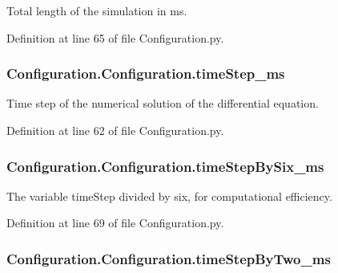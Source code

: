 Total length of the simulation in ms. 



Definition at line 65 of file Configuration.\+py.

\subsubsection[{\texorpdfstring{time\+Step\+\_\+ms}{timeStep_ms}}]{\setlength{\rightskip}{0pt plus 5cm}Configuration.\+Configuration.\+time\+Step\+\_\+ms}\hypertarget{class_configuration_1_1_configuration_a6379aaa6e54523ca81e3713d1846679b}{}\label{class_configuration_1_1_configuration_a6379aaa6e54523ca81e3713d1846679b}


Time step of the numerical solution of the differential equation. 



Definition at line 62 of file Configuration.\+py.

\subsubsection[{\texorpdfstring{time\+Step\+By\+Six\+\_\+ms}{timeStepBySix_ms}}]{\setlength{\rightskip}{0pt plus 5cm}Configuration.\+Configuration.\+time\+Step\+By\+Six\+\_\+ms}\hypertarget{class_configuration_1_1_configuration_aa49387a016f5d528136ab5812821cb99}{}\label{class_configuration_1_1_configuration_aa49387a016f5d528136ab5812821cb99}


The variable time\+Step divided by six, for computational efficiency. 



Definition at line 69 of file Configuration.\+py.

\subsubsection[{\texorpdfstring{time\+Step\+By\+Two\+\_\+ms}{timeStepByTwo_ms}}]{\setlength{\rightskip}{0pt plus 5cm}Configuration.\+Configuration.\+time\+Step\+By\+Two\+\_\+ms}\hypertarget{class_configuration_1_1_configuration_a58f6e3bf5491f8fb229697fc3690aa12}{}\label{class_configuration_1_1_configuration_a58f6e3bf5491f8fb229697fc3690aa12}


